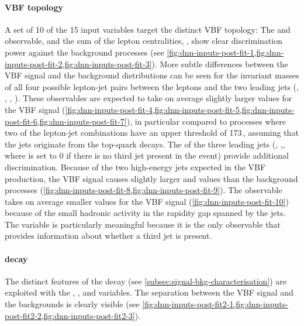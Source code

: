 \paragraph{VBF topology}
A set of 10 of the 15 input variables target the distinct VBF topology: The \mjj and \dyjj observable, and the sum of the lepton centralities, \lepetacent, show clear discrimination power against the background processes (see \cref{fig:dnn-inputs-post-fit-1,fig:dnn-inputs-post-fit-2,fig:dnn-inputs-post-fit-3}). More subtle differences between the VBF signal and the background distributions can be seen for the invariant masses of all four possible lepton-jet pairs between the leptons and the two leading jets (\mlonejone, \mlonejtwo, \mltwojone, \mltwojtwo). These observables are expected to take on average slightly larger values for the VBF signal (\cref{fig:dnn-inputs-post-fit-4,fig:dnn-inputs-post-fit-5,fig:dnn-inputs-post-fit-6,fig:dnn-inputs-post-fit-7}), in particular compared to \ttbar processes where two of the lepton-jet combinations have an upper threshold of 173\,\GeV, assuming that the jets originate from the top-quark decays.
The \pT of the three leading jets (\pTjone, \pTjtwo,\pTjthree, where \pTjthree is set to 0 if there is no third jet present in the event) provide additional discrimination.
Because of the two high-energy jets expected in the VBF production, the VBF signal causes slightly larger \pTjone and \pTjtwo values than the background processes (\cref{fig:dnn-inputs-post-fit-8,fig:dnn-inputs-post-fit-9}).
The \pTjthree observable takes on average smaller values for the VBF signal (\cref{fig:dnn-inputs-post-fit-10}) because of the small hadronic activity in the rapidity gap spanned by the jets. The \pTjthree variable is particularly meaningful because it is the only observable that provides information about whether a third jet is present.

\paragraph{\HWW decay}
The distinct features of the \HWW decay (see \cref{subsec:signal-bkg-characterisation}) are exploited with the \dphill, \mll, and \mT variables.
The separation between the VBF signal and the backgrounds is clearly visible (see \cref{fig:dnn-inputs-post-fit2-1,fig:dnn-inputs-post-fit2-2,fig:dnn-inputs-post-fit2-3}).


